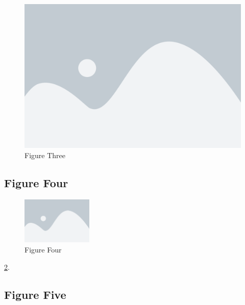 \begin{figure}
  \includegraphics[width=0.9\linewidth]{../images/fig1.png}
  \caption{Figure Three}
  \label{fig:fig3}
\end{figure}

\lipsum[1-1]
\subsection{Figure Four}

\begin{figure} %
  \centering
  \includegraphics[width=0.3\textwidth]{./images/fig1.png}
  \caption{Figure Four}
  \label{fig:fig4}
\end{figure}

\lipsum[1-1] \ref{fig:fig4}.

\subsection{Figure Five}

